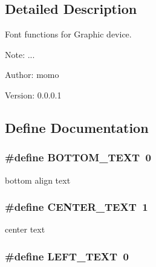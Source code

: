 \subsection{Detailed Description}
Font functions for Graphic device. 

\begin{Desc}
\item[Note:]... \end{Desc}
\begin{Desc}
\item[Author:]momo \end{Desc}
\begin{Desc}
\item[Version:]0.0.0.1 \end{Desc}


\subsection{Define Documentation}
\hypertarget{group__graphic__device__font_g02b7607c323731f6b5d4c4aba6eb8f70}{
\subsubsection[{BOTTOM\_\-TEXT}]{\setlength{\rightskip}{0pt plus 5cm}\#define BOTTOM\_\-TEXT~0}}
\label{group__graphic__device__font_g02b7607c323731f6b5d4c4aba6eb8f70}


bottom align text \hypertarget{group__graphic__device__font_gd0ae9e6dc7894a5b6b1e36fc5260b862}{
\subsubsection[{CENTER\_\-TEXT}]{\setlength{\rightskip}{0pt plus 5cm}\#define CENTER\_\-TEXT~1}}
\label{group__graphic__device__font_gd0ae9e6dc7894a5b6b1e36fc5260b862}


center text \hypertarget{group__graphic__device__font_geaf74eaabed8649b362d27e238658343}{
\subsubsection[{LEFT\_\-TEXT}]{\setlength{\rightskip}{0pt plus 5cm}\#define LEFT\_\-TEXT~0}}
\label{group__graphic__device__font_geaf74eaabed8649b362d27e238658343}


